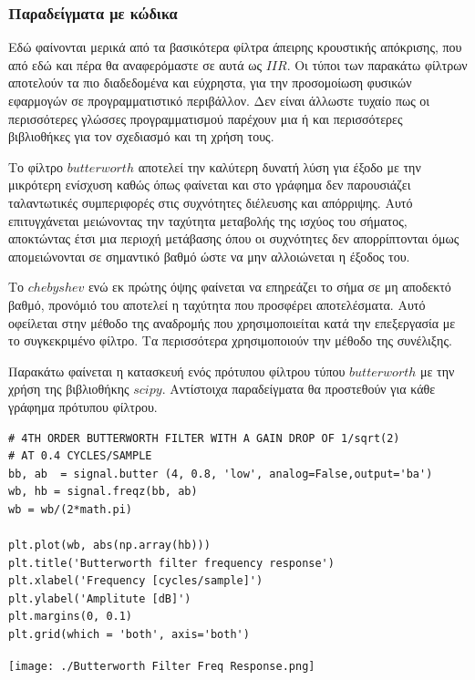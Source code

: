 \documentclass[breaklines=true, 12pt]{article}
\begin{document}
\subsubsection{Παραδείγματα με κώδικα}
\label{sec:org50e154f}
Εδώ φαίνονται μερικά από τα βασικότερα φίλτρα άπειρης κρουστικής απόκρισης, που
από εδώ και πέρα θα αναφερόμαστε σε αυτά ως \(IIR\). Οι τύποι των παρακάτω φίλτρων
αποτελούν τα πιο διαδεδομένα και εύχρηστα, για την προσομοίωση φυσικών εφαρμογών
σε προγραμματιστικό περιβάλλον. Δεν είναι άλλωστε τυχαίο πως οι περισσότερες
γλώσσες προγραμματισμού παρέχουν μια ή και περισσότερες βιβλιοθήκες για τον
σχεδιασμό και τη χρήση τους.

Το φίλτρο \(butterworth\) αποτελεί την καλύτερη δυνατή λύση για έξοδο με την μικρότερη
ενίσχυση καθώς όπως φαίνεται και στο γράφημα δεν παρουσιάζει ταλαντωτικές
συμπεριφορές στις συχνότητες διέλευσης και απόρριψης. Αυτό επιτυγχάνεται
μειώνοντας την ταχύτητα μεταβολής της ισχύος του σήματος, αποκτώντας έτσι μια
περιοχή μετάβασης όπου οι συχνότητες δεν απορρίπτονται όμως απομειώνονται σε
σημαντικό βαθμό ώστε να μην αλλοιώνεται η έξοδος του.

Το \(chebyshev\) ενώ εκ πρώτης όψης φαίνεται να επηρεάζει το σήμα σε μη
αποδεκτό βαθμό, προνόμιό του αποτελεί η ταχύτητα που προσφέρει αποτελέσματα.
Αυτό οφείλεται στην μέθοδο της αναδρομής που χρησιμοποιείται κατά την επεξεργασία
με το συγκεκριμένο φίλτρο. Τα περισσότερα χρησιμοποιούν την μέθοδο της συνέλιξης.

Παρακάτω φαίνεται η κατασκευή ενός πρότυπου φίλτρου τύπου \(butterworth\) με την χρήση
της βιβλιοθήκης \(scipy\). Αντίστοιχα παραδείγματα θα προστεθούν για κάθε γράφημα
πρότυπου φίλτρου.

\begin{verbatim}
# 4TH ORDER BUTTERWORTH FILTER WITH A GAIN DROP OF 1/sqrt(2)
# AT 0.4 CYCLES/SAMPLE
bb, ab  = signal.butter (4, 0.8, 'low', analog=False,output='ba')
wb, hb = signal.freqz(bb, ab)
wb = wb/(2*math.pi)

plt.plot(wb, abs(np.array(hb)))
plt.title('Butterworth filter frequency response')
plt.xlabel('Frequency [cycles/sample]')
plt.ylabel('Amplitute [dB]')
plt.margins(0, 0.1)
plt.grid(which = 'both', axis='both')
\end{verbatim}

\begin{center}
\texttt{[image: ./Butterworth Filter Freq Response.png]}
\end{center}
\end{document}
